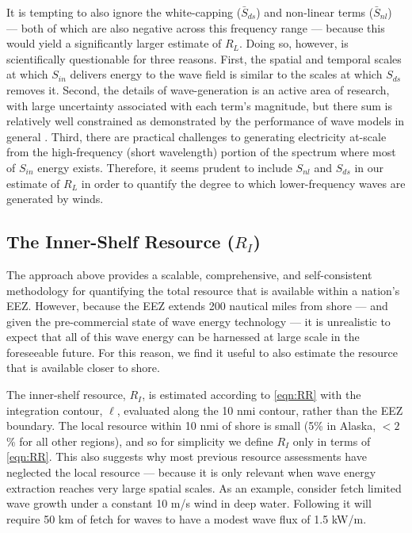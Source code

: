 It is tempting to also ignore the white-capping ($\bar{S}_{ds}$) and non-linear terms ($\bar{S}_{nl}$) — both of which are also negative across this frequency range — because this would yield a significantly larger estimate of $R_L$. Doing so, however, is scientifically questionable for three reasons. First, the spatial and temporal scales at which $S_{in}$ delivers energy to the wave field is similar to the scales at which $S_{ds}$ removes it. Second, the details of wave-generation is an active area of research, with large uncertainty associated with each term's magnitude, but there sum is relatively well constrained as demonstrated by the performance of wave models in general \citep[e.g.][]{ardhuin_semiempirical_2010, van_vledder_source_2016}. Third, there are practical challenges to generating electricity at-scale from the high-frequency (short wavelength) portion of the spectrum where most of $S_{in}$ energy exists. Therefore, it seems prudent to include $S_{nl}$ and $S_{ds}$ in our estimate of $R_L$ in order to quantify the degree to which lower-frequency waves are generated by winds.

\subsection{The Inner-Shelf Resource ($R_I$)}

The approach above provides a scalable, comprehensive, and self-consistent methodology for quantifying the total resource that is available within a nation's EEZ. However, because the EEZ extends 200 nautical miles from shore — and given the pre-commercial state of wave energy technology — it is unrealistic to expect that all of this wave energy can be harnessed at large scale in the foreseeable future. For this reason, we find it useful to also estimate the resource that is available closer to shore.

The inner-shelf resource, $R_I$, is estimated according to \eqref{eqn:RR} with the integration contour, $\ell$, evaluated along the 10 nmi contour, rather than the EEZ boundary.  The local resource within 10 nmi of shore is small (5\% in Alaska, $<2$\% for all other regions), and so for simplicity we define $R_I$ only in terms of \eqref{eqn:RR}. 
This also suggests why most previous resource assessments have neglected the local resource — because it is only relevant when wave energy extraction reaches very large spatial scales. As an example, consider fetch limited wave growth under a constant 10 m/s wind in deep water. Following \citet{donelan1980similarity} it will require 50 km of fetch for waves to have a modest wave flux of 1.5 kW/m. 

